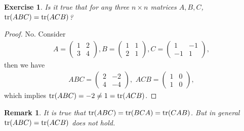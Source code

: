 \documentclass[11pt]{book}
\newtheorem{exercise}{Exercise}[section]
\newtheorem{remark}{Remark}[section]
\theoremstyle{definition}
\numberwithin{equation}{subsection}
\begin{document}
\medskip

\begin{exercise}\label{trace_ABC}
Is it true that for any three $n \times n$ matrices $A, B, C$, ${\rm tr} (ABC) = {\rm tr} (ACB)$?
\end{exercise}
\begin{proof}
No. Consider 
\begin{align*}
    A = \begin{pmatrix}
        1 & 2 \\
        3 & 4
    \end{pmatrix}, B = \begin{pmatrix}
        1 & 1 \\
        2 & 1
    \end{pmatrix}, C = \begin{pmatrix}
        1 & -1 \\
        -1 & 1
    \end{pmatrix},
\end{align*}
then we have 
\begin{align*}
    ABC = \begin{pmatrix}
        2 & -2 \\
        4 & -4
    \end{pmatrix}, \,\, ACB = \begin{pmatrix}
        1 & 0 \\
        1 & 0
    \end{pmatrix},
\end{align*}
which implies ${\rm tr} (ABC) = -2 \neq 1 = {\rm tr} (ACB)$.
\end{proof}
\begin{remark}
It is true that ${\rm tr} (ABC) = {\rm tr} (BCA) = {\rm tr} (CAB)$. But in general ${\rm tr} (ABC) = {\rm tr} (ACB)$ does not hold\cite{16}.
\end{remark}

\medskip
\end{document}

